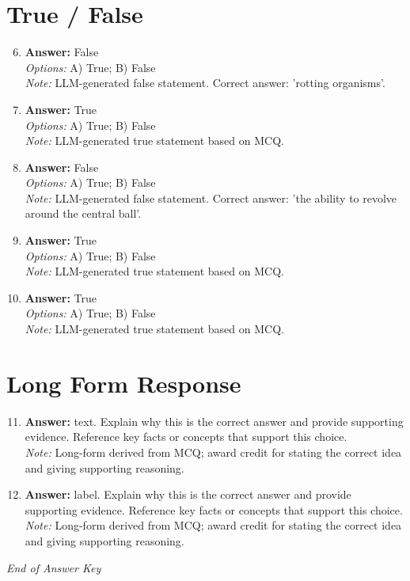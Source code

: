 \documentclass[12pt]{article}
\begin{document}
\section*{True / False}
\begin{enumerate}[label=\arabic*.]
\setcounter{enumi}{5}
\item \textbf{Answer:} False
\\ \textit{Options:} A) True; B) False
\\ \textit{Note:} LLM-generated false statement. Correct answer: 'rotting organisms'.
\item \textbf{Answer:} True
\\ \textit{Options:} A) True; B) False
\\ \textit{Note:} LLM-generated true statement based on MCQ.
\item \textbf{Answer:} False
\\ \textit{Options:} A) True; B) False
\\ \textit{Note:} LLM-generated false statement. Correct answer: 'the ability to revolve around the central ball'.
\item \textbf{Answer:} True
\\ \textit{Options:} A) True; B) False
\\ \textit{Note:} LLM-generated true statement based on MCQ.
\item \textbf{Answer:} True
\\ \textit{Options:} A) True; B) False
\\ \textit{Note:} LLM-generated true statement based on MCQ.
\end{enumerate}

\section*{Long Form Response}
\begin{enumerate}[label=\arabic*.]
\setcounter{enumi}{10}
\item \textbf{Answer:} text. Explain why this is the correct answer and provide supporting evidence. Reference key facts or concepts that support this choice.
\\ \textit{Note:} Long-form derived from MCQ; award credit for stating the correct idea and giving supporting reasoning.
\item \textbf{Answer:} label. Explain why this is the correct answer and provide supporting evidence. Reference key facts or concepts that support this choice.
\\ \textit{Note:} Long-form derived from MCQ; award credit for stating the correct idea and giving supporting reasoning.
\end{enumerate}

\vfill
\noindent\textit{End of Answer Key}
\end{document}
